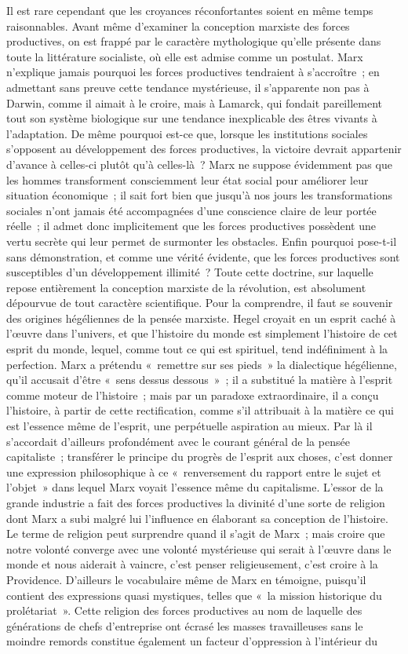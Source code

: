 \documentclass[french,twoside]{book} %
\begin{document}
Il est rare cependant que les croyances réconfortantes soient en même temps raisonnables. Avant même d'examiner la conception marxiste des forces productives, on est frappé par le caractère mythologique qu'elle présente dans toute la littérature socialiste, où elle est admise comme un postulat. Marx n'explique jamais pourquoi les forces productives tendraient à s'accroître ; en admettant sans preuve cette tendance mystérieuse, il s'apparente non pas à Darwin, comme il aimait à le croire, mais à Lamarck, qui fondait pareillement tout son système biologique sur une tendance inexplicable des êtres vivants à l'adaptation. De même pourquoi est-ce que, lorsque les institutions sociales s'opposent au développement des forces productives, la victoire devrait appartenir d'avance à celles-ci plutôt qu'à celles-là ? Marx ne suppose évidemment pas que les hommes transforment consciemment leur état social pour améliorer leur situation économique ; il sait fort bien que jusqu'à nos jours les transformations sociales n'ont jamais été accompagnées d'une conscience claire de leur portée réelle ; il admet donc implicitement que les forces productives possèdent une vertu secrète qui leur permet de surmonter les obstacles. Enfin pourquoi pose-t-il sans démonstration, et comme une vérité évidente, que les forces productives sont susceptibles d'un développement illimité ? Toute cette doctrine, sur laquelle repose entièrement la conception marxiste de la révolution, est absolument dépourvue de tout caractère scientifique. Pour la comprendre, il faut se souvenir des origines hégéliennes de la pensée marxiste. Hegel croyait en un esprit caché à l'œuvre dans l'univers, et que l'histoire du monde est simplement l'histoire de cet esprit du monde, lequel, comme tout ce qui est spirituel, tend indéfiniment à la perfection. Marx a prétendu « remettre sur ses pieds » la dialectique hégélienne, qu'il accusait d'être « sens dessus dessous » ; il a substitué la matière à l'esprit comme moteur de l'histoire ; mais par un paradoxe extraordinaire, il a conçu l'histoire, à partir de cette rectification, comme s'il attribuait à la matière ce qui est l'essence même de l'esprit, une perpétuelle aspiration au mieux. Par là il s'accordait d'ailleurs profondément avec le courant général de la pensée capitaliste ; transférer le principe du progrès de l'esprit aux choses, c'est donner une expression philosophique à ce « renversement du rapport entre le sujet et l'objet » dans lequel Marx voyait l'essence même du capitalisme. L'essor de la grande industrie a fait des forces productives la divinité d'une sorte de religion dont Marx a subi malgré lui l'influence en élaborant sa conception de l'histoire. Le terme de religion peut surprendre quand il s'agit de Marx ; mais croire que notre volonté converge avec une volonté mystérieuse qui serait à l'œuvre dans le monde et nous aiderait à vaincre, c'est penser religieusement, c'est croire à la Providence. D'ailleurs le vocabulaire même de Marx en témoigne, puisqu'il contient des expressions quasi mystiques, telles que « la mission historique du prolétariat ». Cette religion des forces productives au nom de laquelle des générations de chefs d'entreprise ont écrasé les masses travailleuses sans le moindre remords constitue également un facteur d'oppression à l'intérieur du 
\end{document}
